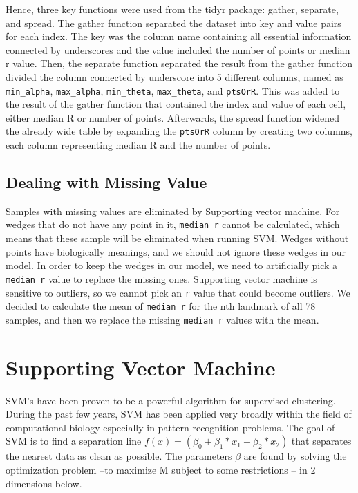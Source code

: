 \documentclass[10pt,letterpaper]{article}
\begin{document}
Hence, three key functions were used from the tidyr package: gather,
separate, and spread. The gather function separated the dataset into key
and value pairs for each index. The key was the column name containing
all essential information connected by underscores and the value
included the number of points or median r value. Then, the separate
function separated the result from the gather function divided the
column connected by underscore into 5 different columns, named as
\texttt{min\_alpha}, \texttt{max\_alpha}, \texttt{min\_theta},
\texttt{max\_theta}, and \texttt{ptsOrR}. This was added to the result
of the gather function that contained the index and value of each cell,
either median R or number of points. Afterwards, the spread function
widened the already wide table by expanding the \texttt{ptsOrR} column
by creating two columns, each column representing median R and the
number of points.

\subsection{Dealing with Missing
Value}\label{dealing-with-missing-value}

Samples with missing values are eliminated by Supporting vector machine.
For wedges that do not have any point in it, \texttt{median\ r} cannot
be calculated, which means that these sample will be eliminated when
running SVM. Wedges without points have biologically meanings, and we
should not ignore these wedges in our model. In order to keep the wedges
in our model, we need to artificially pick a \texttt{median\ r} value to
replace the missing ones. Supporting vector machine is sensitive to
outliers, so we cannot pick an \texttt{r} value that could become
outliers. We decided to calculate the mean of \texttt{median\ r} for the
nth landmark of all 78 samples, and then we replace the missing
\texttt{median\ r} values with the mean.

\section{Supporting Vector Machine}\label{supporting-vector-machine}

SVM's have been proven to be a powerful algorithm for supervised
clustering. During the past few years, SVM has been applied very broadly
within the field of computational biology especially in pattern
recognition problems. The goal of SVM is to find a separation line
\(f(x) = (\beta_0 + \beta_1 * x_1 + \beta_2 * x_2)\) that separates the
nearest data as clean as possible. The parameters \(\beta\) are found by
solving the optimization problem --to maximize M subject to some
restrictions -- in 2 dimensions below.
\end{document}
